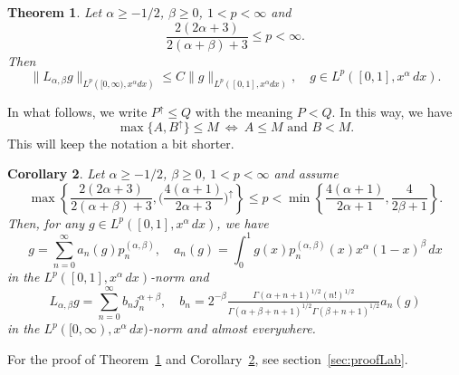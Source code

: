 \documentclass[12pt,leqno]{amsart}
\theoremstyle{plain}
\newtheorem{Thm}{Theorem}[section]
\newtheorem{Cor}[Thm]{Corollary} %
\newcommand{\lpnorm}[3]{\|{#1}\|_{L^{#2}({#3})}} %
\newcommand{\ab}{{(\alpha,\beta)}} %
\begin{document}
\begin{Thm}
\label{th:acotLab}
Let $\alpha \ge -1/2$, $\beta \ge 0$, $1 < p < \infty$ and
\begin{equation*}
    \frac{2(2\alpha+3)}{2(\alpha+\beta)+3} \le p < \infty.
\end{equation*}
Then
\begin{equation*}
    \lpnorm{L_{\alpha,\beta}g}p{[0,\infty),x^{\alpha}dx}
    \le C \lpnorm{g}p{[0,1],x^{\alpha}dx},
    \quad g \in L^p([0,1],x^\alpha\,dx).
\end{equation*}
\end{Thm}

In what follows, we write $P^\uparrow \le Q$ with the meaning $P < Q$. In
this way, we have
\begin{equation*}
    \max\{A,B^\uparrow\} \le M \ \iff \ A \le M \text{ and } B < M.
\end{equation*}
This will keep the notation a bit shorter.

\begin{Cor}
\label{cor:seriesol}
Let $\alpha \ge -1/2$, $\beta \ge 0$, $1 < p < \infty$ and assume
\begin{equation*}
    \max\left\{ \frac{2(2\alpha+3)}{2(\alpha+\beta)+3},
        \Big(\frac{4(\alpha+1)}{2\alpha+3}\Big)^\uparrow \right\}
    \le p <\min\left\{ \frac{4(\alpha+1)}{2\alpha+1},
        \frac4{2\beta+1} \right\}.
\end{equation*}
Then, for any $g \in L^p([0,1],x^\alpha\,dx)$,
we have
\begin{equation*}
    g = \sum_{n=0}^{\infty}a_n(g)p_n^\ab,
    \quad
    a_n(g) = \int_0^1 g(x) p_n^\ab(x) x^\alpha (1-x)^\beta \, dx 
\end{equation*}
in the $L^p([0,1], x^\alpha \, dx)$-norm and
\begin{equation*}
    L_{\alpha,\beta} g = \sum_{n=0}^{\infty}b_{n}j_{n}^{\alpha+\beta},
    \quad
    b_n = 2^{-\beta} \tfrac{\Gamma(\alpha+n+1)^{1/2} (n!)^{1/2}}
        {\Gamma(\alpha+\beta+n+1)^{1/2} \Gamma(\beta+n+1)^{1/2}} a_n(g)
\end{equation*}
in the $L^p([0,\infty),x^\alpha\,dx)$-norm and almost everywhere.
\end{Cor}

For the proof of Theorem~\ref{th:acotLab} and Corollary~\ref{cor:seriesol},
see section~\ref{sec:proofLab}.
\end{document}
